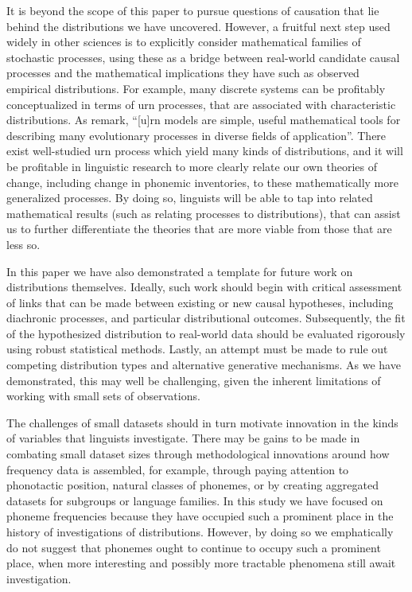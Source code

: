 It is beyond the scope of this paper to pursue questions of causation that lie behind the distributions we have uncovered. However, a fruitful next step used widely in other sciences is to explicitly consider mathematical families of stochastic processes, using these as a bridge between real-world candidate causal processes and the mathematical implications they have such as observed empirical distributions. For example, many discrete systems can be profitably conceptualized in terms of urn processes, that are associated with characteristic distributions. As \textcite[p.~87]{kuba_limiting_2012} remark, ``{[}u{]}rn models are simple, useful mathematical tools for describing many evolutionary processes in diverse fields of application''. There exist well-studied urn process which yield many kinds of distributions, and it will be profitable in linguistic research to more clearly relate our own theories of change, including change in phonemic inventories, to these mathematically more generalized processes. By doing so, linguists will be able to tap into related mathematical results (such as relating processes to distributions), that can assist us to further differentiate the theories that are more viable from those that are less so.

In this paper we have also demonstrated a template for future work on distributions themselves. Ideally, such work should begin with critical assessment of links that can be made between existing or new causal hypotheses, including diachronic processes, and particular distributional outcomes. Subsequently, the fit of the hypothesized distribution to real-world data should be evaluated rigorously using robust statistical methods. Lastly, an attempt must be made to rule out competing distribution types and alternative generative mechanisms. As we have demonstrated, this may well be challenging, given the inherent limitations of working with small sets of observations.

The challenges of small datasets should in turn motivate innovation in the kinds of variables that linguists investigate. There may be gains to be made in combating small dataset sizes through methodological innovations around how frequency data is assembled, for example, through paying attention to phonotactic position, natural classes of phonemes, or by creating aggregated datasets for subgroups or language families. In this study we have focused on phoneme frequencies because they have occupied such a prominent place in the history of investigations of distributions. However, by doing so we emphatically do not suggest that phonemes ought to continue to occupy such a prominent place, when more interesting and possibly more tractable phenomena still await investigation.

